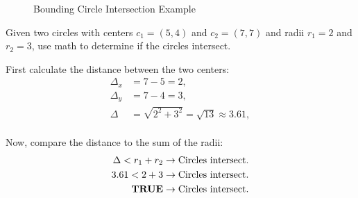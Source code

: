 \begin{figure}[H]
    \begin{center}

        \caption{Bounding Circle Intersection Example}
    \end{center}
\end{figure}

Given two circles with centers $c_1 = (5, 4)$ and $c_2 = (7, 7)$ and radii $r_1
    = 2$ and $r_2 = 3$, use math to determine if the circles intersect.

First calculate the distance between the two centers:
\begin{equation*}
    \begin{aligned}
        \Delta_x & = 7 - 5 = 2,                                 \\
        \Delta_y & = 7 - 4 = 3,                                 \\
        \Delta   & = \sqrt{2^2 + 3^2} = \sqrt{13} \approx 3.61, \\
    \end{aligned}
\end{equation*}

Now, compare the distance to the sum of the radii:
\begin{equation*}
    \begin{aligned}
        \Delta < r_1 + r_2         & \rightarrow \textnormal{Circles intersect.} \\
        3.61 < 2 + 3               & \rightarrow \textnormal{Circles intersect.} \\
        \textnormal{\textbf{TRUE}} & \rightarrow \textnormal{Circles intersect.} \\
    \end{aligned}
\end{equation*}

